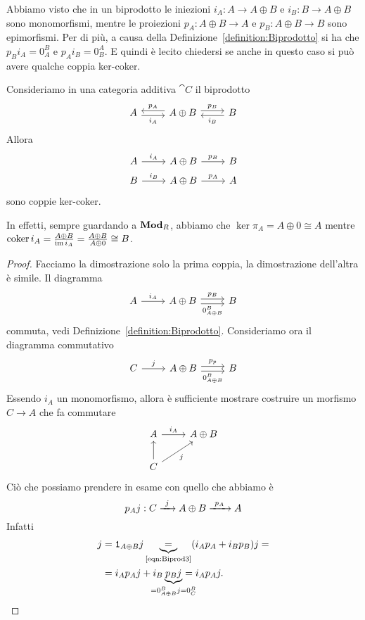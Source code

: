 Abbiamo visto che in un biprodotto le iniezioni
\(i_A : A \to A \oplus B\) e \(i_B : B \to A \oplus B\) sono
monomorfismi, mentre le proiezioni \(p_A : A \oplus B \to A\) e
\(p_B : A \oplus B \to B\) sono epimorfismi. Per di più, a causa della
Definizione~\ref{definition:Biprodotto} si ha che
\(p_B i_A = 0_A^B\) e \(p_A i_B = 0_B^A\). E quindi è lecito
chiedersi se anche in questo caso si può avere qualche coppia ker-coker.

\begin{lemma}\label{lemma:KerCokerInjProj}
  Consideriamo in una categoria additiva \(\cat C\) il biprodotto
  \[
    \begin{tikzcd}
      A \ar["{i_A}", r, shift right, swap] & A \oplus B \ar["{p_A}", l,
      shift right, swap] \ar["{p_B}", r, shift left] & B \ar["{i_B}", l,
      shift left]
    \end{tikzcd}
  \]
  Allora
  \[
    \begin{tikzcd}[row sep=tiny]
      A \ar["{i_A}", r] & A \oplus B \ar["{p_B}", r] & B \\
      B \ar["{i_B}", r] & A \oplus B \ar["{p_A}", r] & A
    \end{tikzcd}
  \]
  sono coppie ker-coker.
\end{lemma}

In effetti, sempre guardando a \(\mathbf{Mod}_R\), abbiamo che
\(\ker \pi_A = A \oplus 0 \cong A\) mentre
\(\operatorname{coker} i_A = \frac{A \oplus B}{\operatorname{im} i_A} = \frac{A \oplus B}{A \oplus
  0} \cong B\).

\begin{proof}
  Facciamo la dimostrazione solo la prima coppia, la dimostrazione
  dell'altra è simile. Il diagramma
  \[
    \begin{tikzcd}
      A \ar["{i_A}", r] & A \oplus B \ar["{p_B}", r, shift left]
      \ar["{0_{A \oplus B}^B}", r, shift right, swap] & B
    \end{tikzcd}
  \]
  commuta, vedi Definizione~\ref{definition:Biprodotto}. Consideriamo
  ora il diagramma commutativo
  \[
    \begin{tikzcd}
      C \ar["{j}", r] & A \oplus B \ar["{p_p}", r, shift left]
      \ar["{0_{A \oplus B}^B}", r, shift right, swap] & B
    \end{tikzcd}
  \]
  Essendo \(i_A\) un monomorfismo, allora è sufficiente mostrare
  costruire un morfismo \(C \to A\) che fa commutare
  \[
    \begin{tikzcd}
      A \ar["{i_A}",r] & A \oplus B \\
      C \ar[u] \ar["{j}", ur, swap]
    \end{tikzcd}
  \]
  Ciò che possiamo prendere in esame con quello che abbiamo è
  \[
    p_A j : C \xrightarrow{\ j\ } A \oplus B \xrightarrow{\ p_A\ } A
  \]
  Infatti
  \begin{align*}
    j &= \id_{A \oplus B} j \underbrace{=}_{\text{\eqref{eqn:Biprod3}}}
        (i_A p_A + i_B p_B) j = \\
      &= i_A p_A j + i_B \underbrace{p_B j}_{\mathclap{\cramped{= 0_{A \oplus B}^B j = 0_C^B}}} = i_A p_A j . \qedhere
  \end{align*}
\end{proof}

